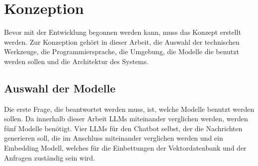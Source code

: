 \chapter{Konzeption}
\label{c:konz}
Bevor mit der Entwicklung begonnen werden kann, muss das Konzept erstellt werden. 
Zur Konzeption gehört in dieser Arbeit, die Auswahl der technischen Werkzeuge, 
die Programmiersprache, die Umgebung, die Modelle die benutzt werden sollen und die 
Architektur des Systems.

\section{Auswahl der Modelle}
\label{s:konz:mod}
Die erste Frage, die beantwortet werden muss, ist, 
welche Modelle benutzt werden sollen. Da innerhalb dieser Arbeit LLMs miteinander verglichen werden, werden fünf Modelle benötigt. 
Vier LLMs für
den Chatbot selbst, der die Nachrichten generieren soll, die im Anschluss miteinander verglichen werden
 und ein Embedding Modell,
welches für die Einbettungen der Vektordatenbank und der Anfragen zuständig sein wird.

